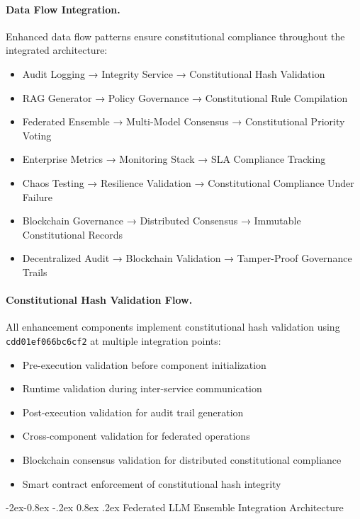 \documentclass[manuscript,screen,9pt]{acmart}
\makeatletter
\renewcommand\subsubsection{\@startsection{subsubsection}{3}{\z@}%
  {-2ex\@plus -0.8ex \@minus -.2ex}%
  {0.8ex \@plus .2ex}%
  {\normalfont\normalsize\bfseries}}
\makeatother
\begin{document}
\paragraph{Data Flow Integration.} Enhanced data flow patterns ensure constitutional compliance throughout the integrated architecture:
\begin{itemize}[itemsep=1pt,parsep=1pt]
    \item Audit Logging → Integrity Service → Constitutional Hash Validation
    \item RAG Generator → Policy Governance → Constitutional Rule Compilation
    \item Federated Ensemble → Multi-Model Consensus → Constitutional Priority Voting
    \item Enterprise Metrics → Monitoring Stack → SLA Compliance Tracking
    \item Chaos Testing → Resilience Validation → Constitutional Compliance Under Failure
    \item Blockchain Governance → Distributed Consensus → Immutable Constitutional Records
    \item Decentralized Audit → Blockchain Validation → Tamper-Proof Governance Trails
\end{itemize}

\paragraph{Constitutional Hash Validation Flow.} All enhancement components implement constitutional hash validation using \texttt{\footnotesize{cdd01ef066bc6cf2}} at multiple integration points:
\begin{itemize}[itemsep=1pt,parsep=1pt]
    \item Pre-execution validation before component initialization
    \item Runtime validation during inter-service communication
    \item Post-execution validation for audit trail generation
    \item Cross-component validation for federated operations
    \item Blockchain consensus validation for distributed constitutional compliance
    \item Smart contract enforcement of constitutional hash integrity
\end{itemize}

\subsubsection{Federated LLM Ensemble Integration Architecture}
\label{subsubsec:federated_llm_integration}
\end{document}
